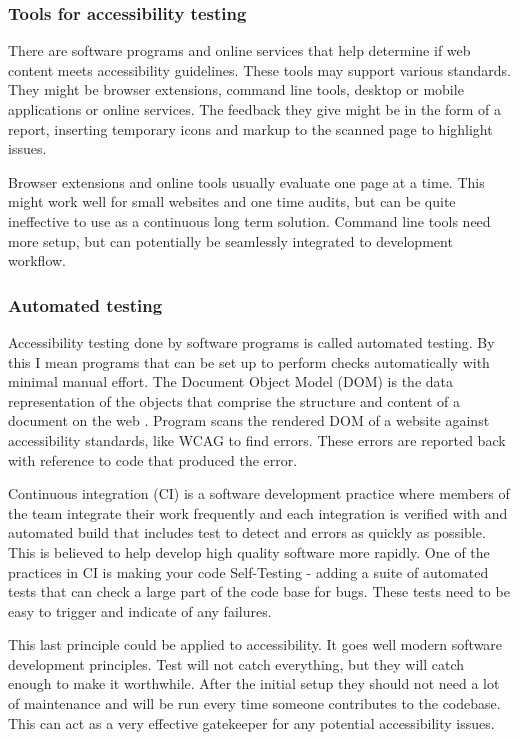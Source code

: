 \documentclass{master_thesis}
\begin{document}
\subsubsection{Tools for accessibility testing}

There are software programs and online services that help determine if web content meets accessibility guidelines. These tools may support various standards. They might be browser extensions, command line tools, desktop or mobile applications or online services. The feedback they give might be in the form of a report, inserting temporary icons and markup to the scanned page to highlight issues. \citep{AbouZahra2017}

Browser extensions and online tools usually evaluate one page at a time. This might work well for small websites and one time audits, but can be quite ineffective to use as a continuous long term solution. Command line tools need more setup, but can potentially be seamlessly integrated to development workflow.

\subsubsection{Automated testing}

Accessibility testing done by software programs is called automated testing. By this I mean programs that can be set up to perform checks automatically with minimal manual effort. The Document Object Model (DOM) is the data representation of the objects that comprise the structure and content of a document on the web \citep{MDN2023}. Program scans the rendered DOM of a website against accessibility standards, like WCAG to find errors. These errors are reported back with reference to code that produced the error.

Continuous integration (CI) is a software development practice where members of the team integrate their work frequently and each integration is verified with and automated build that includes test to detect and errors as quickly as possible. This is believed to help develop high quality software more rapidly. One of the practices in CI is making your code Self-Testing - adding a suite of automated tests that can check a large part of the code base for bugs. These tests need to be easy to trigger and indicate of any failures.
\citep{Fowler2006}

This last principle could be applied to accessibility. It goes well modern software development principles. Test will not catch everything, but they will catch enough to make it worthwhile. After the initial setup they should not need a lot of maintenance and will be run every time someone contributes to the codebase. This can act as a very effective gatekeeper for any potential accessibility issues.
\end{document}
